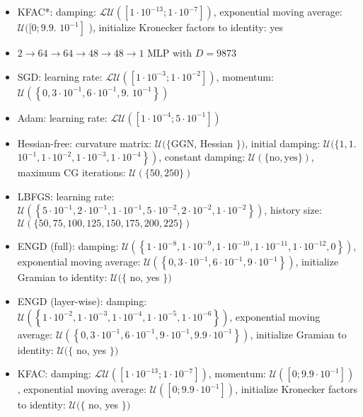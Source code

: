 \documentclass[10pt]{article}
\begin{document}
\begin{itemize}
  \item KFAC*: damping: $\mathcal{L U}\left(\left[1 \cdot 10^{-13} ; 1 \cdot 10^{-7}\right]\right)$, exponential moving average: $\mathcal{U}([0 ; 9.9$. $\left.10^{-1}\right]$ ), initialize Kronecker factors to identity: yes
  \item $2 \rightarrow 64 \rightarrow 64 \rightarrow 48 \rightarrow 48 \rightarrow 1$ MLP with $D=9873$
  \item SGD: learning rate: $\mathcal{L U}\left(\left[1 \cdot 10^{-3} ; 1 \cdot 10^{-2}\right]\right)$, momentum: $\mathcal{U}\left(\left\{0,3 \cdot 10^{-1}, 6 \cdot 10^{-1}, 9\right.\right.$. $\left.\left.10^{-1}\right\}\right)$
  \item Adam: learning rate: $\mathcal{L U}\left(\left[1 \cdot 10^{-4} ; 5 \cdot 10^{-1}\right]\right)$
  \item Hessian-free: curvature matrix: $\mathcal{U}(\{\mathrm{GGN}$, Hessian $\})$, initial damping: $\mathcal{U}(\{1,1$. $\left.\left.10^{-1}, 1 \cdot 10^{-2}, 1 \cdot 10^{-3}, 1 \cdot 10^{-4}\right\}\right)$, constant damping: $\mathcal{U}(\{\mathrm{no}, \mathrm{yes}\})$, maximum CG iterations: $\mathcal{U}(\{50,250\})$
  \item LBFGS: learning rate: $\mathcal{U}\left(\left\{5 \cdot 10^{-1}, 2 \cdot 10^{-1}, 1 \cdot 10^{-1}, 5 \cdot 10^{-2}, 2 \cdot 10^{-2}, 1 \cdot 10^{-2}\right\}\right)$, history size: $\mathcal{U}(\{50,75,100,125,150,175,200,225\})$
  \item ENGD (full): damping: $\mathcal{U}\left(\left\{1 \cdot 10^{-8}, 1 \cdot 10^{-9}, 1 \cdot 10^{-10}, 1 \cdot 10^{-11}, 1 \cdot 10^{-12}, 0\right\}\right)$, exponential moving average: $\mathcal{U}\left(\left\{0,3 \cdot 10^{-1}, 6 \cdot 10^{-1}, 9 \cdot 10^{-1}\right\}\right)$, initialize Gramian to identity: $\mathcal{U}(\{$ no, yes $\})$
  \item ENGD (layer-wise): damping: $\mathcal{U}\left(\left\{1 \cdot 10^{-2}, 1 \cdot 10^{-3}, 1 \cdot 10^{-4}, 1 \cdot 10^{-5}, 1 \cdot 10^{-6}\right\}\right)$, exponential moving average: $\mathcal{U}\left(\left\{0,3 \cdot 10^{-1}, 6 \cdot 10^{-1}, 9 \cdot 10^{-1}, 9.9 \cdot 10^{-1}\right\}\right)$, initialize Gramian to identity: $\mathcal{U}(\{$ no, yes $\})$
  \item KFAC: damping: $\mathcal{L U}\left(\left[1 \cdot 10^{-13} ; 1 \cdot 10^{-7}\right]\right)$, momentum: $\mathcal{U}\left(\left[0 ; 9.9 \cdot 10^{-1}\right]\right)$, exponential moving average: $\mathcal{U}\left(\left[0 ; 9.9 \cdot 10^{-1}\right]\right)$, initialize Kronecker factors to identity: $\mathcal{U}(\{$ no, yes $\})$

\end{itemize}
\end{document}
